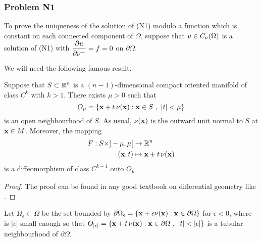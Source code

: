 \subsubsection{Problem N1}
To prove the uniqueness of the solution of (N1) modulo a
function which is constant on each connected component of $\Omega$,
suppose that $u \in C_{\mathbf{\nu}}(\Omega)$ is a solution of
(N1) with $\displaystyle \frac{\partial{u}}{\partial \mathbf{\nu}^-} = f = 0$ on
$\partial \Omega$.

We will need the following famous result.

\begin{theorem}\label{pot_TBN}
Suppose that $\displaystyle S \subset \mathbb{R}^n$ is a $(n-1)$-dimensional
compact oriented manifold of class $\displaystyle C^k$ with $k>1$.
There exists $\mu >0$ such that
\[
O_\mu = \left\{ \mathbf{x} + t\, \mathbf{\nu}(\mathbf{x}) : \mathbf{x} \in S \ ,
\ |t|<\mu \right\}
\]
is an open neighbourhood of $S$.  As usual, $\mathbf{\nu}(\mathbf{x})$ is
the outward unit normal to $S$ at $\mathbf{x} \in M$.  Moreover, the
mapping
\begin{align*}
F: S\times ]-\mu,\mu[ &\rightarrow \mathbb{R}^n \\
(\mathbf{x}, t) &\mapsto \mathbf{x} + t\, \mathbf{\nu}(\mathbf{x})
\end{align*}
is a diffeomorphism of class $\displaystyle C^{k-1}$ onto $O_\mu$.
\end{theorem}

\begin{proof}
The proof can be found in any good textbook on differential geometry
like \cite{Ab,Sp}.
\end{proof}

Let $\Omega_\epsilon \subset \Omega$ be the set bounded by
$\partial \Omega_\epsilon = \{ \mathbf{x} + \epsilon \mathbf{\nu}(\mathbf{x}) : \mathbf{x}
\in \partial \Omega \}$ for $\epsilon<0$, where is $|\epsilon|$ small
enough so that
$\displaystyle
O_{|\epsilon|} = \left\{ \VEC{x} + t\, \VEC{\nu}(\VEC{x}) : \VEC{x} \in
  \partial \Omega \ , \ |t|<|\epsilon| \right\}$ is a tubular
neighbourhood of $\partial \Omega$.

